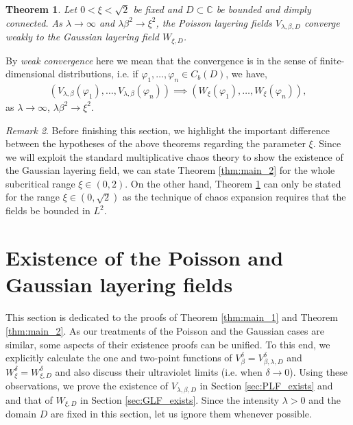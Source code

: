\documentclass[a4paper, 11pt, reqno]{amsart}
\theoremstyle{definition} \newtheorem{defn}{Definition}[section]
\theoremstyle{remark} \newtheorem{rem}[defn]{Remark}
\theoremstyle{remark} \newtheorem*{rem*}{Remark}
\theoremstyle{plain} \newtheorem{thm}[defn]{Theorem}
\theoremstyle{plain} \newtheorem{lem}[defn]{Lemma}
\theoremstyle{plain} \newtheorem{prop}[defn]{Proposition}
\theoremstyle{plain} \newtheorem{cor}[defn]{Corollary}
\theoremstyle{remark} \newtheorem{exm}[defn]{\textbf{Example}}
\theoremstyle{remark} \newtheorem{exms}[defn]{\textbf{Examples}}
\theoremstyle{remark} \newtheorem*{bl}{}
\numberwithin{equation}{section} %
\newcommand{\C}{\mathbb{C}}
\begin{document}
    \begin{thm} \label{thm:main_3}
        Let $0<\xi< \sqrt{2}$ be fixed and $D \subset \C$ be bounded and dimply connected. As $\lambda \to \infty$ and $\lambda \beta^2 \to \xi^2$, the Poisson layering fields $V_{\lambda, \beta, D}$ converge weakly to the Gaussian layering field $W_{\xi, D}$.  
    \end{thm}
    By \textit{weak convergence} here we mean that the convergence is in the sense of finite-dimensional distributions, i.e. if $\varphi_1, \ldots, \varphi_n \in C_b(D)$, we have,
			\begin{align}\label{eq:f.d.d.}
				(V_{\lambda, \beta}(\varphi_1), \ldots, V_{\lambda, \beta}(\varphi_n)) \implies (W_{\xi}(\varphi_1), \ldots, W_{\xi}(\varphi_n)),
			\end{align}
	as $\lambda \to \infty$, $\lambda \beta^2 \to \xi^2$.

    \begin{rem}
        Before finishing this section, we highlight the important difference between the hypotheses of the above theorems regarding the parameter $\xi$. Since we will exploit the standard multiplicative chaos theory to show the existence of the Gaussian layering field, we can state Theorem \ref{thm:main_2} for the whole subcritical range $\xi \in (0,2)$. On the other hand, Theorem \ref{thm:main_3} can only be stated for the range $\xi \in (0, \sqrt{2})$ as the technique of chaos expansion requires that the fields be bounded in $L^2$. 
    \end{rem}
   	
   	\section{Existence of the Poisson and Gaussian layering fields}\label{sec:PLF_GLF_exist}

    This section is dedicated to the proofs of Theorem \ref{thm:main_1} and Theorem \ref{thm:main_2}. As our treatments of the Poisson and the Gaussian cases are similar, some aspects of their existence proofs can be unified. To this end, we explicitly  calculate the one and two-point functions of $V^{\delta}_{\beta}= V^{\delta}_{\beta, \lambda, D}$ and $W^{\delta}_{\xi} = W^{\delta}_{\xi, D}$ and also discuss their ultraviolet limits (i.e. when $\delta \to 0$). Using these observations, we prove the existence of $V_{\lambda, \beta, D}$ in Section \ref{sec:PLF_exists} and and that of $W_{\xi, D}$ in Section \ref{sec:GLF_exists}. Since the intensity $\lambda >0$ and the domain $D$ are fixed in this section, let us ignore them whenever possible. 
	
\end{document}
